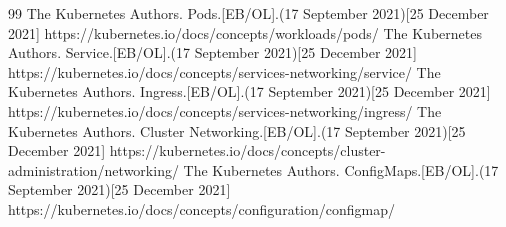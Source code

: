 \documentclass{article}
\begin{document}
\begin{thebibliography} {99}
    The Kubernetes Authors. Pods.[EB/OL].(17 September 2021)[25 December 2021] https://kubernetes.io/docs/concepts/workloads/pods/
    The Kubernetes Authors. Service.[EB/OL].(17 September 2021)[25 December 2021] https://kubernetes.io/docs/concepts/services-networking/service/
    The Kubernetes Authors. Ingress.[EB/OL].(17 September 2021)[25 December 2021] https://kubernetes.io/docs/concepts/services-networking/ingress/
    The Kubernetes Authors. Cluster Networking.[EB/OL].(17 September 2021)[25 December 2021] https://kubernetes.io/docs/concepts/cluster-administration/networking/
    The Kubernetes Authors. ConfigMaps.[EB/OL].(17 September 2021)[25 December 2021] https://kubernetes.io/docs/concepts/configuration/configmap/
  \end{thebibliography}
\end{document}
